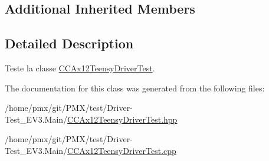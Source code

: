 \subsection*{Additional Inherited Members}


\subsection{Detailed Description}
Teste la classe \hyperlink{classtest_1_1CCAx12TeensyDriverTest}{C\+C\+Ax12\+Teensy\+Driver\+Test}. 

The documentation for this class was generated from the following files\+:\begin{DoxyCompactItemize}
\item 
/home/pmx/git/\+P\+M\+X/test/\+Driver-\/\+Test\+\_\+\+E\+V3.\+Main/\hyperlink{CCAx12TeensyDriverTest_8hpp}{C\+C\+Ax12\+Teensy\+Driver\+Test.\+hpp}\item 
/home/pmx/git/\+P\+M\+X/test/\+Driver-\/\+Test\+\_\+\+E\+V3.\+Main/\hyperlink{CCAx12TeensyDriverTest_8cpp}{C\+C\+Ax12\+Teensy\+Driver\+Test.\+cpp}\end{DoxyCompactItemize}
